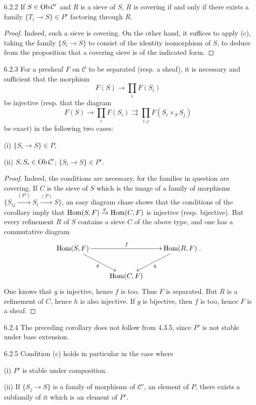 \begin{corollary}{6.2.2}\label{IV.6.2.2}
If \(S\in\operatorname{Ob}\mathcal C'\) and \(R\) is a
sieve of \(S\), \(R\) is covering if and
only if there exists a family
\(\{T_i\to S\}\in P'\) factoring through \(R\).
\end{corollary}
\begin{proof}
Indeed, such a sieve is covering.
On the other hand, it suffices to apply
(c), taking the family \(\{S_i\to S\}\)
to consist of the identity isomorphism
of \(S\), to deduce from the proposition
that a covering sieve is of the indicated form.
\end{proof}
\begin{corollary}{6.2.3}\label{IV.6.2.3}
For a presheaf \(F\) on \(\mathcal C\)
to be separated (resp. a sheaf), it is
necessary and sufficient that the morphism
\[
F(S)\longrightarrow\prod_i F(S_i)
\]
be injective (resp. that the diagram
\[
F(S)\longrightarrow\prod_i F(S_i)
\rightrightarrows\prod_{i,j}F(S_i\times_S S_j)
\]
be exact) in the following two cases:

(i) \(\{S_i\to S\}\in P\),

(ii) \(S,S_i\in\operatorname{Ob}\mathcal C'\);
\(\{S_i\to S\}\in P'\).
\end{corollary}
\begin{proof}
Indeed, the conditions are necessary,
for the families in question are covering.
If \(C\) is the sieve of \(S\) which is
the image of a family of morphisms
\(\{S_{ij}\xrightarrow{(P')}S_i\xrightarrow{(P)}S\}\),
an easy diagram chase shows that the
conditions of the corollary imply that
\(\operatorname{Hom}(S,F)\xrightarrow{g}\operatorname{Hom}(C,F)\)
is injective (resp. bijective).
But every refinement \(R\) of \(S\)
contains a sieve \(C\) of the above type,
and one has a commutative diagram
\[
\xymatrix{
\Hom(S,F)\ar[rr]^f\ar[dr]_g & & \Hom(R,F)\ar[dl]^h\\
 & \Hom(C,F) & }.
\]
One knows that \(g\) is injective,
hence \(f\) is too. Thus \(F\) is separated.
But \(R\) is a refinement of \(C\),
hence \(h\) is also injective.
If \(g\) is bijective, then \(f\)
is too, hence \(F\) is a sheaf.
\end{proof}
\begin{remark}{6.2.4}\label{IV.6.2.4}
The preceding corollary does not follow
from 4.3.5, since \(P'\) is not stable
under base extension.
\end{remark}
\begin{remark}{6.2.5}\label{IV.6.2.5}
Condition (c) holds in particular in the case where

(i) \(P'\) is stable under composition.

(ii) If \(\{S_j\to S\}\) is a family
of morphisms of \(\mathcal C'\), an
element of \(P\), there exists a
subfamily of it which is an element of \(P'\).
\end{remark}


